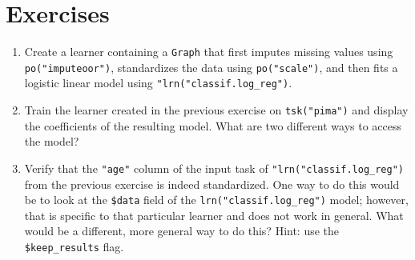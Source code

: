 \hypertarget{exercises-5}{%
\section{Exercises}\label{exercises-5}}

\begin{enumerate}
\def\labelenumi{\arabic{enumi}.}
\tightlist
\item
  Create a learner containing a \texttt{Graph} that first imputes
  missing values using \texttt{po("imputeoor")}, standardizes the data
  using \texttt{po("scale")}, and then fits a logistic linear model
  using \texttt{"lrn("classif.log\_reg")}.
\item
  Train the learner created in the previous exercise on
  \texttt{tsk("pima")} and display the coefficients of the resulting
  model. What are two different ways to access the model?
\item
  Verify that the \texttt{"age"} column of the input task of
  \texttt{"lrn("classif.log\_reg")} from the previous exercise is indeed
  standardized. One way to do this would be to look at the
  \texttt{\$data} field of the \texttt{lrn("classif.log\_reg")} model;
  however, that is specific to that particular learner and does not work
  in general. What would be a different, more general way to do this?
  Hint: use the \texttt{\$keep\_results} flag.
\end{enumerate}
